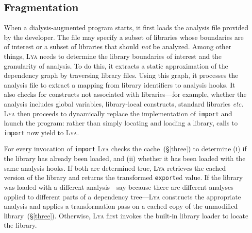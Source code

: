 \documentclass[letterpaper,twocolumn,10pt]{article}
\def\omit#1{}
\def\etc{{\em etc.}\xspace}
\newcommand{\ttt}[1]{\texttt{#1}}
\newcommand{\sx}[1]{(\S\ref{#1})}
\newcommand{\sys}{{\scshape Lya}\xspace}
\newcommand{\pc}{PIC\xspace}
\begin{document}

\subsection{Fragmentation}
\label{one}

When a dialysis-augmented program starts, it first loads the analysis file provided by the developer. 
The file may specify a subset of libraries whose boundaries are of interest or a subset of libraries that should \emph{not} be analyzed.
Among other things, \sys needs to determine the library boundaries of interest and the granularity of analysis.
To do this, it extracts a static approximation of the dependency graph by traversing library files.
Using this graph, it processes the analysis file to extract a mapping from library identifiers to analysis hooks.
It also checks for constructs not associated with libraries---for example, whether the analysis includes global variables, library-local constructs, standard libraries \etc
\sys then proceeds to dynamically replace the implementation of \ttt{import} and launch the program:
  rather than simply locating and loading a library, calls to \ttt{import} now yield to \sys.

For every invocation of \ttt{import} \sys checks the cache~\sx{three} to determine
  (i) if the library has already been loaded, and
  (ii) whether it has been loaded with the same analysis hooks.
If both are determined true, \sys retrieves the cached version of the library and returns the transformed \ttt{export}ed value.
If the library was loaded with a different analysis---say because there are different analyses applied to different parts of a dependency tree---\sys constructs the appropriate analysis and applies a transformation pass on a cached copy of the unmodified library~\sx{three}.
Otherwise, \sys first invokes the built-in library loader to locate the library.
\end{document}
